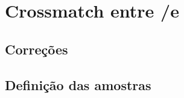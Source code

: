 


\chapter{Crossmatch entre \SDSS/\starlight e \galex}
\label{sec:Crossmatch}




\section{Correções}
\label{sec:Crossmatch:Correcoes}

\section{Definição das amostras}
\label{sec:Crossmatch:DefAmostras}


